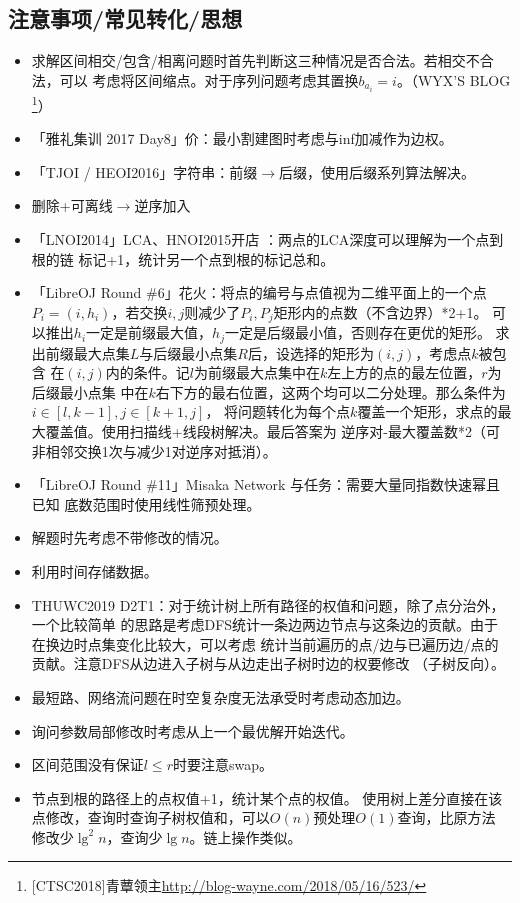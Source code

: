 \subsection{注意事项/常见转化/思想}
\begin{itemize}
	\item 求解区间相交/包含/相离问题时首先判断这三种情况是否合法。若相交不合法，可以
	      考虑将区间缩点。对于序列问题考虑其置换$b_{a_i}=i$。（WYX'S BLOG
	      \footnote{[CTSC2018]青蕈领主\url{http://blog-wayne.com/2018/05/16/523/}}）
	\item 「雅礼集训 2017 Day8」价：最小割建图时考虑与inf加减作为边权。
	\item 「TJOI / HEOI2016」字符串：前缀$\rightarrow$后缀，使用后缀系列算法解决。
	\item 删除+可离线$\rightarrow$逆序加入
	\item 「LNOI2014」LCA、HNOI2015开店 ：两点的LCA深度可以理解为一个点到根的链
	      标记+1，统计另一个点到根的标记总和。
	\item 「LibreOJ Round \#6」花火：将点的编号与点值视为二维平面上的一个点
	      $P_i=(i,h_i)$，若交换$i,j$则减少了$P_i,P_j$矩形内的点数（不含边界）*2+1。
	      可以推出$h_i$一定是前缀最大值，$h_j$一定是后缀最小值，否则存在更优的矩形。
	      求出前缀最大点集$L$与后缀最小点集$R$后，设选择的矩形为$(i,j)$，考虑点$k$被包含
	      在$(i,j)$内的条件。记$l$为前缀最大点集中在$k$左上方的点的最左位置，$r$为后缀最小点集
	      中在$k$右下方的最右位置，这两个均可以二分处理。那么条件为$i\in [l,k-1],j\in [k+1,j]$，
	      将问题转化为每个点$k$覆盖一个矩形，求点的最大覆盖值。使用扫描线+线段树解决。最后答案为
	      逆序对-最大覆盖数*2（可非相邻交换1次与减少1对逆序对抵消）。
	\item 「LibreOJ Round \#11」Misaka Network 与任务：需要大量同指数快速幂且已知
	      底数范围时使用线性筛预处理。
	\item 解题时先考虑不带修改的情况。
	\item 利用时间存储数据。
	\item THUWC2019 D2T1：对于统计树上所有路径的权值和问题，除了点分治外，一个比较简单
	      的思路是考虑DFS统计一条边两边节点与这条边的贡献。由于在换边时点集变化比较大，可以考虑
	      统计当前遍历的点/边与已遍历边/点的贡献。注意DFS从边进入子树与从边走出子树时边的权要修改
	      （子树反向）。
	\item 最短路、网络流问题在时空复杂度无法承受时考虑动态加边。
	\item 询问参数局部修改时考虑从上一个最优解开始迭代。
	\item 区间范围没有保证$l\leq r$时要注意swap。
	\item 节点到根的路径上的点权值+1，统计某个点的权值。
	使用树上差分直接在该点修改，查询时查询子树权值和，可以$O(n)$预处理$O(1)$查询，比原方法
	修改少$\lg^2 n$，查询少$\lg n$。链上操作类似。


\end{itemize}
